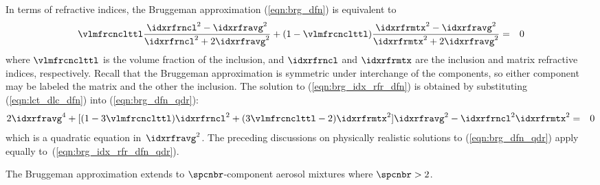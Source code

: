 \documentclass[12pt,twoside]{book}
\begin{document}
In terms of refractive indices, the Bruggeman approximation
(\ref{eqn:brg_dfn}) is equivalent to
\begin{eqnarray}
\vlmfrcnclttl\frac{\idxrfrncl^{2}-\idxrfravg^{2}}{\idxrfrncl^{2}+2\idxrfravg^{2}}+
(1-\vlmfrcnclttl)\frac{\idxrfrmtx^{2}-\idxrfravg^{2}}{\idxrfrmtx^{2}+2\idxrfravg^{2}}
& = & 0
\label{eqn:brg_idx_rfr_dfn}
\end{eqnarray}
where
$\vlmfrcnclttl$ is the volume fraction of the inclusion,
and $\idxrfrncl$ and $\idxrfrmtx$ are the inclusion and matrix
refractive indices, respectively.
Recall that the Bruggeman approximation is symmetric under interchange
of the components, so either component may be labeled the matrix and
the other the inclusion.
The solution to (\ref{eqn:brg_idx_rfr_dfn}) is obtained by
substituting (\ref{eqn:lct_dlc_dfn}) into (\ref{eqn:brg_dfn_qdr}):
\begin{eqnarray}
2\idxrfravg^{4}+ 
[(1-3\vlmfrcnclttl)\idxrfrncl^{2}+(3\vlmfrcnclttl-2)\idxrfrmtx^{2}]\idxrfravg^{2}-
\idxrfrncl^{2}\idxrfrmtx^{2} & = & 0
\label{eqn:brg_idx_rfr_dfn_qdr}
\end{eqnarray}
which is a quadratic equation in~$\idxrfravg^{2}$. 
The preceding discussions on physically realistic solutions to
(\ref{eqn:brg_dfn_qdr}) apply equally
to~(\ref{eqn:brg_idx_rfr_dfn_qdr}). 

The Bruggeman approximation extends to $\spcnbr$-component aerosol
mixtures where $\spcnbr > 2$.
\end{document}
